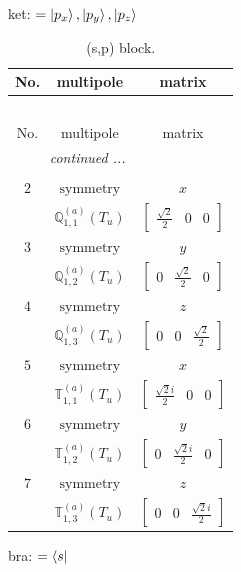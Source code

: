 \documentclass[fleqn,8pt,landscape]{jsarticle}
\begin{document}
\noindent
ket: $=\ket{p_{x}}, \ket{p_{y}}, \ket{p_{z}}$
\renewcommand{\arraystretch}{1.6}
\begin{longtable}{ccc}
\caption{(s,p) block.}
 \\
 \hline \hline
No. & multipole & matrix \\ \hline \endfirsthead

\multicolumn{2}{l}{\tablename\ \thetable{}} \\
 \hline \hline
No. & multipole & matrix \\ \hline \endhead

 \hline \hline
\multicolumn{2}{r}{\footnotesize\it continued ...} \\ \endfoot

 \hline \hline
\multicolumn{2}{r}{} \\ \endlastfoot

$ 2 $ & $ \text{symmetry} $ & $ x $ \\
$  $ & $ \mathbb{Q}_{1,1}^{(a)}(T_{u}) $ & $ \begin{bmatrix} \frac{\sqrt{2}}{2} & 0 & 0 \end{bmatrix} $ \\ \hline
$ 3 $ & $ \text{symmetry} $ & $ y $ \\
$  $ & $ \mathbb{Q}_{1,2}^{(a)}(T_{u}) $ & $ \begin{bmatrix} 0 & \frac{\sqrt{2}}{2} & 0 \end{bmatrix} $ \\ \hline
$ 4 $ & $ \text{symmetry} $ & $ z $ \\
$  $ & $ \mathbb{Q}_{1,3}^{(a)}(T_{u}) $ & $ \begin{bmatrix} 0 & 0 & \frac{\sqrt{2}}{2} \end{bmatrix} $ \\ \hline
$ 5 $ & $ \text{symmetry} $ & $ x $ \\
$  $ & $ \mathbb{T}_{1,1}^{(a)}(T_{u}) $ & $ \begin{bmatrix} \frac{\sqrt{2} i}{2} & 0 & 0 \end{bmatrix} $ \\ \hline
$ 6 $ & $ \text{symmetry} $ & $ y $ \\
$  $ & $ \mathbb{T}_{1,2}^{(a)}(T_{u}) $ & $ \begin{bmatrix} 0 & \frac{\sqrt{2} i}{2} & 0 \end{bmatrix} $ \\ \hline
$ 7 $ & $ \text{symmetry} $ & $ z $ \\
$  $ & $ \mathbb{T}_{1,3}^{(a)}(T_{u}) $ & $ \begin{bmatrix} 0 & 0 & \frac{\sqrt{2} i}{2} \end{bmatrix} $ \\ \hline
\end{longtable}
bra: $=\bra{s}$
\end{document}
